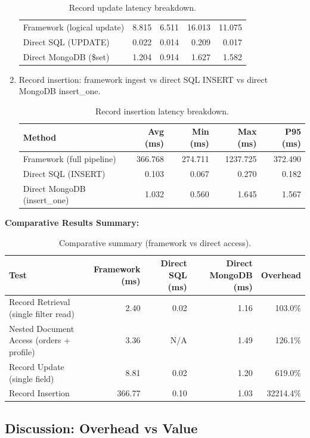 \documentclass[12pt,a4paper]{article}
\begin{document}
\begin{enumerate}
\begin{table}[H]
\begin{tabular}{l r r r r}
    \midrule
    Framework (logical update) & 8.815 & 6.511 & 16.013 & 11.075 \\
    Direct SQL (UPDATE) & 0.022 & 0.014 & 0.209 & 0.017 \\
    Direct MongoDB (\$set) & 1.204 & 0.914 & 1.627 & 1.582 \\
    \bottomrule
    \end{tabular}
    \caption{Record update latency breakdown.}
    \end{table}
	\item Record insertion: framework ingest vs direct SQL INSERT vs direct MongoDB insert\_one.
	\begin{table}[H]
    \centering
    \begin{tabular}{l r r r r}
    \toprule
    \textbf{Method} & \textbf{Avg (ms)} & \textbf{Min (ms)} & \textbf{Max (ms)} & \textbf{P95 (ms)} \\
    \midrule
    Framework (full pipeline) & 366.768 & 274.711 & 1237.725 & 372.490 \\
    Direct SQL (INSERT) & 0.103 & 0.067 & 0.270 & 0.182 \\
    Direct MongoDB (insert\_one) & 1.032 & 0.560 & 1.645 & 1.567 \\
    \bottomrule
    \end{tabular}
    \caption{Record insertion latency breakdown.}
    \end{table}
\end{enumerate}

\textbf{Comparative Results Summary:}
\begin{table}[H]
\centering
\begin{tabular}{l r r r r}
\toprule
\textbf{Test} & \textbf{Framework (ms)} & \textbf{Direct SQL (ms)} & \textbf{Direct MongoDB (ms)} & \textbf{Overhead} \\
\midrule
Record Retrieval (single filter read) & 2.40 & 0.02 & 1.16 & 103.0\% \\
Nested Document Access (orders + profile) & 3.36 & N/A & 1.49 & 126.1\% \\
Record Update (single field) & 8.81 & 0.02 & 1.20 & 619.0\% \\
Record Insertion & 366.77 & 0.10 & 1.03 & 32214.4\% \\
\bottomrule
\end{tabular}
\caption{Comparative summary (framework vs direct access).}
\end{table}


\subsection{Discussion: Overhead vs Value}
\end{document}
